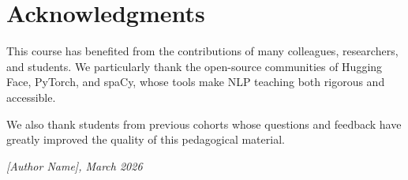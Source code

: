 \section*{Acknowledgments}

This course has benefited from the contributions of many colleagues,
researchers, and students. We particularly thank the open-source communities
of Hugging Face, PyTorch, and spaCy, whose tools make NLP teaching both
rigorous and accessible.

We also thank students from previous cohorts whose questions and feedback have
greatly improved the quality of this pedagogical material.

\vfill
\begin{flushright}
\textit{[Author Name], March 2026}
\end{flushright}

